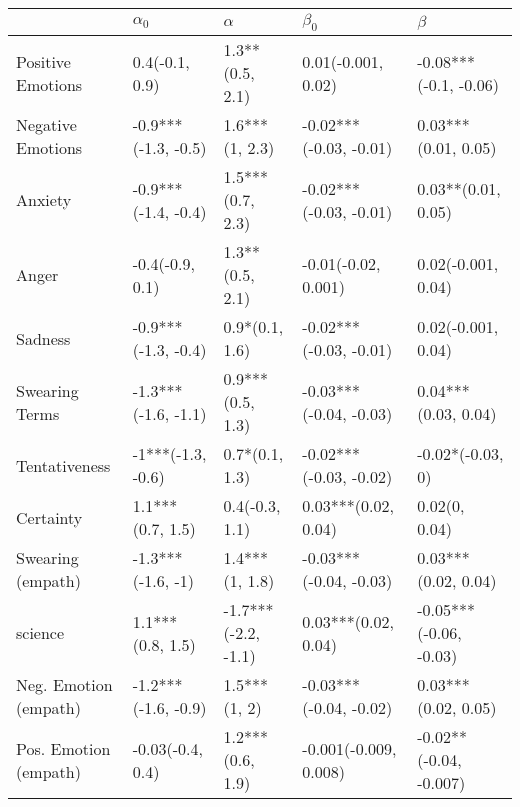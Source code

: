 \begin{tabular}{lllll}
\toprule
{} &           $\alpha_0$ &             $\alpha$ &               $\beta_0$ &                 $\beta$ \\
\midrule
Positive Emotions     &       0.4(-0.1, 0.9) &      1.3**(0.5, 2.1) &      0.01(-0.001, 0.02) &   -0.08***(-0.1, -0.06) \\
Negative Emotions     &  -0.9***(-1.3, -0.5) &       1.6***(1, 2.3) &  -0.02***(-0.03, -0.01) &     0.03***(0.01, 0.05) \\
Anxiety               &  -0.9***(-1.4, -0.4) &     1.5***(0.7, 2.3) &  -0.02***(-0.03, -0.01) &      0.03**(0.01, 0.05) \\
Anger                 &      -0.4(-0.9, 0.1) &      1.3**(0.5, 2.1) &     -0.01(-0.02, 0.001) &      0.02(-0.001, 0.04) \\
Sadness               &  -0.9***(-1.3, -0.4) &       0.9*(0.1, 1.6) &  -0.02***(-0.03, -0.01) &      0.02(-0.001, 0.04) \\
Swearing Terms        &  -1.3***(-1.6, -1.1) &     0.9***(0.5, 1.3) &  -0.03***(-0.04, -0.03) &     0.04***(0.03, 0.04) \\
Tentativeness         &    -1***(-1.3, -0.6) &       0.7*(0.1, 1.3) &  -0.02***(-0.03, -0.02) &        -0.02*(-0.03, 0) \\
Certainty             &     1.1***(0.7, 1.5) &       0.4(-0.3, 1.1) &     0.03***(0.02, 0.04) &           0.02(0, 0.04) \\
Swearing (empath)     &    -1.3***(-1.6, -1) &       1.4***(1, 1.8) &  -0.03***(-0.04, -0.03) &     0.03***(0.02, 0.04) \\
science               &     1.1***(0.8, 1.5) &  -1.7***(-2.2, -1.1) &     0.03***(0.02, 0.04) &  -0.05***(-0.06, -0.03) \\
Neg. Emotion (empath) &  -1.2***(-1.6, -0.9) &         1.5***(1, 2) &  -0.03***(-0.04, -0.02) &     0.03***(0.02, 0.05) \\
Pos. Emotion (empath) &     -0.03(-0.4, 0.4) &     1.2***(0.6, 1.9) &   -0.001(-0.009, 0.008) &  -0.02**(-0.04, -0.007) \\
\bottomrule
\end{tabular}
